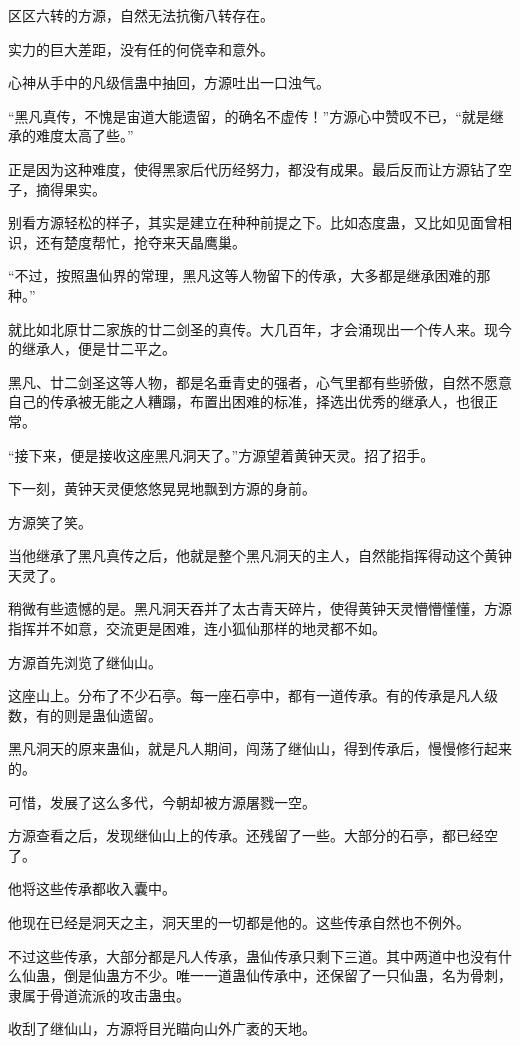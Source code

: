 \begin{this_body}
区区六转的方源，自然无法抗衡八转存在。

实力的巨大差距，没有任的何侥幸和意外。

心神从手中的凡级信蛊中抽回，方源吐出一口浊气。

“黑凡真传，不愧是宙道大能遗留，的确名不虚传！”方源心中赞叹不已，“就是继承的难度太高了些。”

正是因为这种难度，使得黑家后代历经努力，都没有成果。最后反而让方源钻了空子，摘得果实。

别看方源轻松的样子，其实是建立在种种前提之下。比如态度蛊，又比如见面曾相识，还有楚度帮忙，抢夺来天晶鹰巢。

“不过，按照蛊仙界的常理，黑凡这等人物留下的传承，大多都是继承困难的那种。”

就比如北原廿二家族的廿二剑圣的真传。大几百年，才会涌现出一个传人来。现今的继承人，便是廿二平之。

黑凡、廿二剑圣这等人物，都是名垂青史的强者，心气里都有些骄傲，自然不愿意自己的传承被无能之人糟蹋，布置出困难的标准，择选出优秀的继承人，也很正常。

“接下来，便是接收这座黑凡洞天了。”方源望着黄钟天灵。招了招手。

下一刻，黄钟天灵便悠悠晃晃地飘到方源的身前。

方源笑了笑。

当他继承了黑凡真传之后，他就是整个黑凡洞天的主人，自然能指挥得动这个黄钟天灵了。

稍微有些遗憾的是。黑凡洞天吞并了太古青天碎片，使得黄钟天灵懵懵懂懂，方源指挥并不如意，交流更是困难，连小狐仙那样的地灵都不如。

方源首先浏览了继仙山。

这座山上。分布了不少石亭。每一座石亭中，都有一道传承。有的传承是凡人级数，有的则是蛊仙遗留。

黑凡洞天的原来蛊仙，就是凡人期间，闯荡了继仙山，得到传承后，慢慢修行起来的。

可惜，发展了这么多代，今朝却被方源屠戮一空。

方源查看之后，发现继仙山上的传承。还残留了一些。大部分的石亭，都已经空了。

他将这些传承都收入囊中。

他现在已经是洞天之主，洞天里的一切都是他的。这些传承自然也不例外。

不过这些传承，大部分都是凡人传承，蛊仙传承只剩下三道。其中两道中也没有什么仙蛊，倒是仙蛊方不少。唯一一道蛊仙传承中，还保留了一只仙蛊，名为骨刺，隶属于骨道流派的攻击蛊虫。

收刮了继仙山，方源将目光瞄向山外广袤的天地。


\end{this_body}
